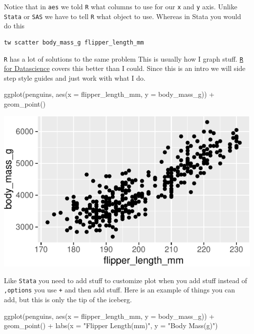 \documentclass[]{tufte-handout}
\newenvironment{Shaded}{}{}
\newcommand{\AttributeTok}[1]{\textcolor[rgb]{0.49,0.56,0.16}{#1}}
\newcommand{\FunctionTok}[1]{\textcolor[rgb]{0.02,0.16,0.49}{#1}}
\newcommand{\NormalTok}[1]{#1}
\newcommand{\SpecialCharTok}[1]{\textcolor[rgb]{0.25,0.44,0.63}{#1}}
\newcommand{\StringTok}[1]{\textcolor[rgb]{0.25,0.44,0.63}{#1}}
\begin{document}
Notice that in \texttt{aes} we told \texttt{R} what columns to use for
our \texttt{x} and \texttt{y} axis. Unlike \texttt{Stata} or
\texttt{SAS} we have to tell \texttt{R} what object to use. Whereas in
Stata you would do this

\begin{verbatim}
tw scatter body_mass_g flipper_length_mm
\end{verbatim}

\texttt{R} has a lot of solutions to the same problem This is usually
how I graph stuff. \href{https://r4ds.had.co.nz/index.html}{\texttt{R}
for Datascience} covers this better than I could. Since this is an intro
we will side step style guides and just work with what I do.

\begin{Shaded}
\begin{Highlighting}[]
\FunctionTok{ggplot}\NormalTok{(penguins, }\FunctionTok{aes}\NormalTok{(}\AttributeTok{x =}\NormalTok{ flipper\_length\_mm, }\AttributeTok{y =}\NormalTok{ body\_mass\_g)) }\SpecialCharTok{+}
  \FunctionTok{geom\_point}\NormalTok{()}
\end{Highlighting}
\end{Shaded}

\begin{center}\includegraphics{R-Guide_files/figure-latex/scatter-basic-global-1} \end{center}

Like \texttt{Stata} you need to add stuff to customize plot when you add
stuff instead of \texttt{,options} you use \texttt{+} and then add
stuff. Here is an example of things you can add, but this is only the
tip of the iceberg.

\begin{Shaded}
\begin{Highlighting}[]
\FunctionTok{ggplot}\NormalTok{(penguins, }\FunctionTok{aes}\NormalTok{(}\AttributeTok{x =}\NormalTok{ flipper\_length\_mm, }\AttributeTok{y =}\NormalTok{ body\_mass\_g)) }\SpecialCharTok{+}
  \FunctionTok{geom\_point}\NormalTok{() }\SpecialCharTok{+}
  \FunctionTok{labs}\NormalTok{(}\AttributeTok{x =} \StringTok{"Flipper Length(mm)"}\NormalTok{, }\AttributeTok{y =} \StringTok{"Body Mass(g)"}\NormalTok{)}
\end{Highlighting}
\end{Shaded}
\end{document}
